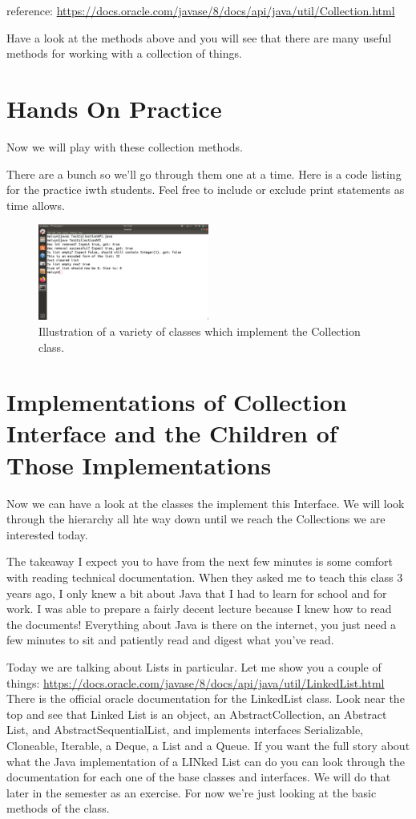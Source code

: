 \documentclass[10pt]{article}
\begin{document}
reference:
\url{https://docs.oracle.com/javase/8/docs/api/java/util/Collection.html}

Have a look at the methods above and you will see that there are many useful
methods for working with a collection of things.

\section{Hands On Practice}
Now we will play with these collection methods.

There are a bunch so we'll go through them one at a time.
Here is a code listing for the practice iwth students. Feel free to include or
exclude print statements as time allows.



\begin{figure}[h]
  \centering
    \includegraphics[width=0.5\textwidth]{outputOfCollectionsAPIExperiment.png}
  \caption{Illustration of a variety of classes which implement the Collection class.}
\end{figure}


\section{Implementations of Collection Interface and the Children of Those
Implementations}
Now we can have a look at the classes the implement this Interface.
We will look through the hierarchy all hte way down until we reach the
Collections we are interested today.

The takeaway I expect you to have from the next few minutes is some comfort with
reading technical documentation. When they asked me to teach this class 3 years
ago, I only knew a bit about Java that I had to learn for school and for work. I
was able to prepare a fairly decent lecture because I knew how to read the
documents! Everything about Java is there on the internet, you just need a few
minutes to sit and patiently read and digest what you've read.

Today we are talking about Lists in particular. Let me show you a couple of
things:
\url{https://docs.oracle.com/javase/8/docs/api/java/util/LinkedList.html}
There  is the official oracle documentation for the LinkedList class.
Look near the top and see that  Linked List is an object, an AbstractCollection,
an Abstract List, and AbstractSequentialList, and implements interfaces
Serializable, Cloneable,  Iterable, a Deque, a List and a Queue.
If you want the full story about what the Java implementation of  a LINked List
can do you can look through the documentation for each one of the base classes
and interfaces. We will do that later in the semester as an exercise. For now
we're just looking at the basic methods of the class.
\end{document}
